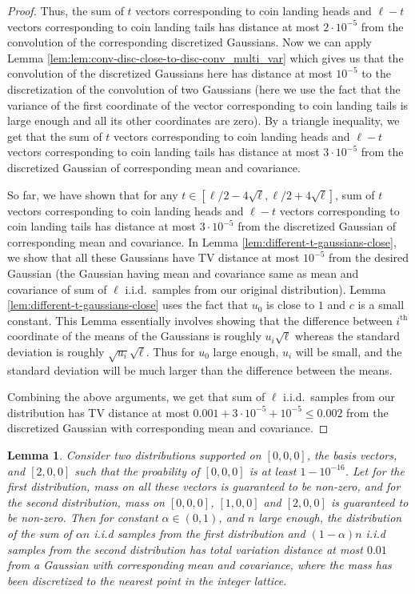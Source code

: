\documentclass[10pt]{article} %
\theoremstyle{plain}
\newtheorem{lemma}[theorem]{Lemma}
\begin{document}
\begin{proof}
	Thus, the sum of $t$ vectors corresponding to coin landing heads and $\ell - t$ vectors corresponding to coin landing tails has distance at most $2 \cdot 10^{-5}$ from the convolution of the corresponding discretized Gaussians. Now we can apply Lemma \ref{lem:lem:conv-disc-close-to-disc-conv_multi_var} which gives us that the convolution of the discretized Gaussians here has distance at most $10^{-5}$ to the discretization of the convolution of two Gaussians (here we use the fact that the variance of the first coordinate of the vector corresponding to coin landing tails is large enough and all its other coordinates are zero).  By a triangle inequality, we get that the sum of $t$ vectors corresponding to coin landing heads and $\ell - t$ vectors corresponding to coin landing tails has distance at most $3\cdot 10^{-5}$ from the discretized Gaussian of corresponding mean and covariance.
	
	So far, we have shown that for any $t \in [\ell/2 - 4\sqrt{\ell},\ell/2+4\sqrt{\ell}]$, sum of $t$ vectors corresponding to coin landing heads and $\ell - t$ vectors corresponding to coin landing tails has distance at most $3\cdot 10^{-5}$ from the discretized Gaussian of corresponding mean and covariance. In Lemma \ref{lem:different-t-gaussians-close}, we show that all these Gaussians have TV distance at most $10^{-5}$ from the desired Gaussian (the Gaussian having mean and covariance same as mean and covariance of sum of $\ell$ i.i.d.\ samples from our original distribution). Lemma \ref{lem:different-t-gaussians-close} uses the fact that $u_0$ is close to $1$ and $c$ is a small constant. This Lemma essentially involves showing that the difference between $i^{\text{th}}$ coordinate of the means of the Gaussians is roughly $u_i \sqrt{\ell}$ whereas the standard deviation is roughly $\sqrt{u_i}\sqrt{\ell}$. Thus for $u_0$ large enough, $u_i$ will be small, and the standard deviation will be much larger than the difference between the means.
	
	Combining the above arguments, we get that sum of $\ell$ i.i.d.\ samples from our distribution has TV distance at most $0.001 + 3\cdot 10^{-5} +  10^{-5} \leq 0.002$ from the discretized Gaussian with corresponding mean and covariance.
	
	
\end{proof}
\begin{lemma}
	\label{lem:clt}
	Consider two distributions supported on $[0, 0, 0]$, the basis vectors, and $[2, 0, 0]$ such that the proability of $[0, 0, 0]$ is at least $1 - 10^{-16}$. Let for the first distribution, mass on all these vectors is guaranteed to be non-zero, and for the second distribution, mass on $[0, 0, 0]$, $[1, 0, 0]$ and $[2, 0, 0]$ is guaranteed to be non-zero.
	Then for constant $\alpha \in (0, 1)$, and $n$ large enough, the distribution of the sum of $\alpha n$ i.i.d samples from the first distribution and $(1-\alpha)n$ i.i.d samples from the second distribution has total variation distance at most $0.01$ from a Gaussian with corresponding mean and covariance, where the mass has been discretized to the nearest point in the integer lattice.
\end{lemma}
\end{document}
